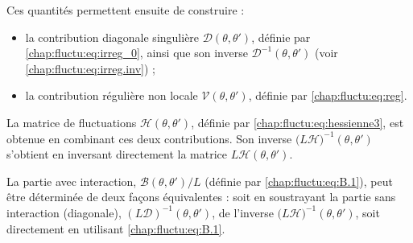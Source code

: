 Ces quantités permettent ensuite de construire :
\begin{itemize}[label = $\bullet$]
	\item la contribution diagonale singulière \( \mathcal{D}(\theta, \theta') \), définie par \eqref{chap:fluctu:eq:irreg_0}, ainsi que son inverse \( \mathcal{D}^{-1}(\theta, \theta') \) (voir \eqref{chap:fluctu:eq:irreg.inv}) ;
	\item la contribution régulière non locale \( \mathcal{V}(\theta, \theta') \), définie par \eqref{chap:fluctu:eq:reg}.
\end{itemize}


\medskip

La matrice de fluctuations \( \mathcal{H}(\theta, \theta') \), définie par \eqref{chap:fluctu:eq:hessienne3}, est obtenue en combinant ces deux contributions. Son inverse \( \big(L \mathcal{H}\big)^{-1}(\theta, \theta') \) s’obtient en inversant directement la matrice \( L \mathcal{H}(\theta, \theta') \).

\medskip

La partie avec interaction, \( \mathcal{B}(\theta, \theta')/L \) (définie par \eqref{chap:fluctu:eq:B.1}), peut être déterminée de deux façons équivalentes : soit en soustrayant la partie sans interaction (diagonale), \((L\mathcal{D})^{-1}(\theta, \theta')\), de l’inverse \(\big(L \mathcal{H}\big)^{-1}(\theta, \theta')\), soit directement en utilisant \eqref{chap:fluctu:eq:B.1}.



%

